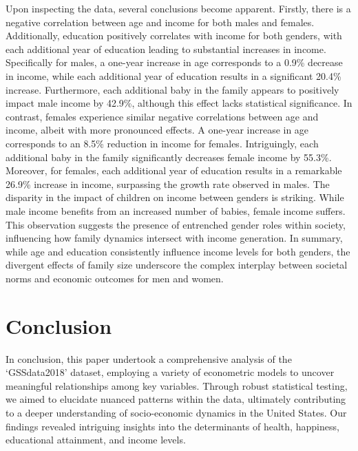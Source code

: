 \documentclass{article}[13pt]
\begin{document}
\begin{enumerate}
\qquad Upon inspecting the data, several conclusions become apparent. Firstly, there is a negative correlation between age and income for both males and females. Additionally, education positively correlates with income for both genders, with each additional year of education leading to substantial increases in income.
Specifically for males, a one-year increase in age corresponds to a 0.9\% decrease in income, while each additional year of education results in a significant 20.4\% increase. Furthermore, each additional baby in the family appears to positively impact male income by 42.9\%, although this effect lacks statistical significance.
In contrast, females experience similar negative correlations between age and income, albeit with more pronounced effects. A one-year increase in age corresponds to an 8.5\% reduction in income for females. Intriguingly, each additional baby in the family significantly decreases female income by 55.3\%.
Moreover, for females, each additional year of education results in a remarkable 26.9\% increase in income, surpassing the growth rate observed in males.
The disparity in the impact of children on income between genders is striking. While male income benefits from an increased number of babies, female income suffers. This observation suggests the presence of entrenched gender roles within society, influencing how family dynamics intersect with income generation.
In summary, while age and education consistently influence income levels for both genders, the divergent effects of family size underscore the complex interplay between societal norms and economic outcomes for men and women.\end{enumerate}

\section{Conclusion}

\qquad In conclusion, this paper undertook a comprehensive analysis of the `GSSdata2018' dataset, employing a 
variety of econometric models to uncover meaningful relationships among key variables. Through robust 
statistical testing, we aimed to elucidate nuanced patterns within the data, ultimately 
contributing to a deeper understanding of socio-economic dynamics in the United States. 
Our findings revealed intriguing insights into the determinants of health, happiness, educational attainment, 
and income levels.
\end{document}
